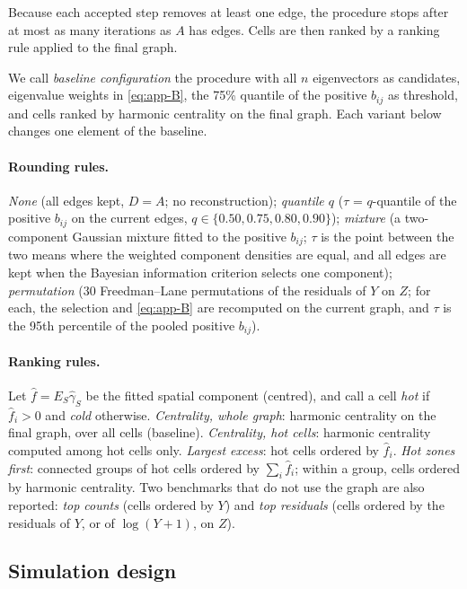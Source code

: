 Because each accepted step removes at least one edge, the procedure stops after at most as many iterations as $A$ has edges. Cells are then ranked by a ranking rule applied to the final graph.

We call \emph{baseline configuration} the procedure with all $n$ eigenvectors as candidates, eigenvalue weights in \eqref{eq:app-B}, the 75\% quantile of the positive $b_{ij}$ as threshold, and cells ranked by harmonic centrality on the final graph. Each variant below changes one element of the baseline.

\paragraph{Rounding rules.}
\emph{None} (all edges kept, $D=A$; no reconstruction);
\emph{quantile $q$} ($\tau$ = $q$-quantile of the positive $b_{ij}$ on the current edges, $q\in\{0.50, 0.75, 0.80, 0.90\}$);
\emph{mixture} (a two-component Gaussian mixture fitted to the positive $b_{ij}$; $\tau$ is the point between the two means where the weighted component densities are equal, and all edges are kept when the Bayesian information criterion selects one component);
\emph{permutation} (30 Freedman--Lane permutations of the residuals of $Y$ on $Z$; for each, the selection and \eqref{eq:app-B} are recomputed on the current graph, and $\tau$ is the 95th percentile of the pooled positive $b_{ij}$).

\paragraph{Ranking rules.}
Let $\hat f = E_S\hat\gamma_S$ be the fitted spatial component (centred), and call a cell \emph{hot} if $\hat f_i>0$ and \emph{cold} otherwise.
\emph{Centrality, whole graph}: harmonic centrality on the final graph, over all cells (baseline).
\emph{Centrality, hot cells}: harmonic centrality computed among hot cells only.
\emph{Largest excess}: hot cells ordered by $\hat f_i$.
\emph{Hot zones first}: connected groups of hot cells ordered by $\sum_{i}\hat f_i$; within a group, cells ordered by harmonic centrality.
Two benchmarks that do not use the graph are also reported: \emph{top counts} (cells ordered by $Y$) and \emph{top residuals} (cells ordered by the residuals of $Y$, or of $\log(Y+1)$, on $Z$).

\subsection{Simulation design}
\label{app:rec-design}

